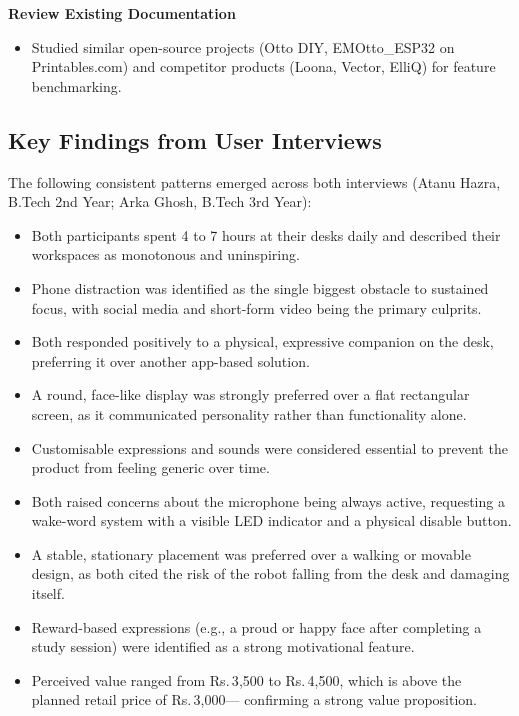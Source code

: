 \documentclass[12pt,a4paper]{article}
\begin{document}
\textbf{Review Existing Documentation}
\begin{itemize}[leftmargin=*]
\item Studied similar open-source projects (Otto DIY, EMOtto\_ESP32 on
      Printables.com) and competitor products (Loona, Vector, ElliQ)
      for feature benchmarking.
\end{itemize}

\newpage
\subsection*{Key Findings from User Interviews}

The following consistent patterns emerged across both interviews
(Atanu Hazra, B.Tech 2nd Year; Arka Ghosh, B.Tech 3rd Year):

\begin{itemize}[leftmargin=*]
\item Both participants spent 4 to 7 hours at their desks daily and
      described their workspaces as monotonous and uninspiring.
\item Phone distraction was identified as the single biggest obstacle
      to sustained focus, with social media and short-form video being
      the primary culprits.
\item Both responded positively to a physical, expressive companion on
      the desk, preferring it over another app-based solution.
\item A round, face-like display was strongly preferred over a flat
      rectangular screen, as it communicated personality rather than
      functionality alone.
\item Customisable expressions and sounds were considered essential to
      prevent the product from feeling generic over time.
\item Both raised concerns about the microphone being always active,
      requesting a wake-word system with a visible LED indicator and
      a physical disable button.
\item A stable, stationary placement was preferred over a walking or
      movable design, as both cited the risk of the robot falling from
      the desk and damaging itself.
\item Reward-based expressions (e.g., a proud or happy face after
      completing a study session) were identified as a strong
      motivational feature.
\item Perceived value ranged from Rs.\,3{,}500 to Rs.\,4{,}500, which
      is above the planned retail price of Rs.\,3{,}000--- confirming
      a strong value proposition.
\end{itemize}
\end{document}
